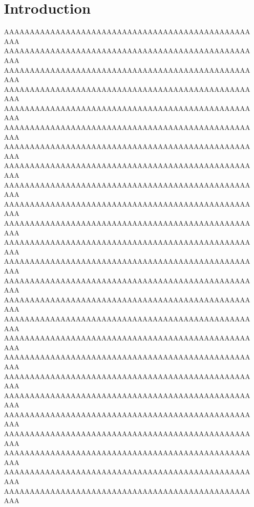 \documentclass[final,11pt,baselinegrid]{../../uit-thesis}
\begin{document}
\chapter{Introduction}
AAAAAAAAAAAAAAAAAAAAAAAAAAAAAAAAAAAAAAAAAAAAAAAAAAA\newline
AAAAAAAAAAAAAAAAAAAAAAAAAAAAAAAAAAAAAAAAAAAAAAAAAAA\newline
AAAAAAAAAAAAAAAAAAAAAAAAAAAAAAAAAAAAAAAAAAAAAAAAAAA\newline
AAAAAAAAAAAAAAAAAAAAAAAAAAAAAAAAAAAAAAAAAAAAAAAAAAA\newline
AAAAAAAAAAAAAAAAAAAAAAAAAAAAAAAAAAAAAAAAAAAAAAAAAAA\newline
AAAAAAAAAAAAAAAAAAAAAAAAAAAAAAAAAAAAAAAAAAAAAAAAAAA\newline
AAAAAAAAAAAAAAAAAAAAAAAAAAAAAAAAAAAAAAAAAAAAAAAAAAA\newline
AAAAAAAAAAAAAAAAAAAAAAAAAAAAAAAAAAAAAAAAAAAAAAAAAAA\newline
AAAAAAAAAAAAAAAAAAAAAAAAAAAAAAAAAAAAAAAAAAAAAAAAAAA\newline
AAAAAAAAAAAAAAAAAAAAAAAAAAAAAAAAAAAAAAAAAAAAAAAAAAA\newline
AAAAAAAAAAAAAAAAAAAAAAAAAAAAAAAAAAAAAAAAAAAAAAAAAAA\newline
AAAAAAAAAAAAAAAAAAAAAAAAAAAAAAAAAAAAAAAAAAAAAAAAAAA\newline
AAAAAAAAAAAAAAAAAAAAAAAAAAAAAAAAAAAAAAAAAAAAAAAAAAA\newline
AAAAAAAAAAAAAAAAAAAAAAAAAAAAAAAAAAAAAAAAAAAAAAAAAAA\newline
AAAAAAAAAAAAAAAAAAAAAAAAAAAAAAAAAAAAAAAAAAAAAAAAAAA\newline
AAAAAAAAAAAAAAAAAAAAAAAAAAAAAAAAAAAAAAAAAAAAAAAAAAA\newline
AAAAAAAAAAAAAAAAAAAAAAAAAAAAAAAAAAAAAAAAAAAAAAAAAAA\newline
AAAAAAAAAAAAAAAAAAAAAAAAAAAAAAAAAAAAAAAAAAAAAAAAAAA\newline
AAAAAAAAAAAAAAAAAAAAAAAAAAAAAAAAAAAAAAAAAAAAAAAAAAA\newline
AAAAAAAAAAAAAAAAAAAAAAAAAAAAAAAAAAAAAAAAAAAAAAAAAAA\newline
AAAAAAAAAAAAAAAAAAAAAAAAAAAAAAAAAAAAAAAAAAAAAAAAAAA\newline
AAAAAAAAAAAAAAAAAAAAAAAAAAAAAAAAAAAAAAAAAAAAAAAAAAA\newline
AAAAAAAAAAAAAAAAAAAAAAAAAAAAAAAAAAAAAAAAAAAAAAAAAAA\newline
AAAAAAAAAAAAAAAAAAAAAAAAAAAAAAAAAAAAAAAAAAAAAAAAAAA\newline
AAAAAAAAAAAAAAAAAAAAAAAAAAAAAAAAAAAAAAAAAAAAAAAAAAA\newline
\end{document}
